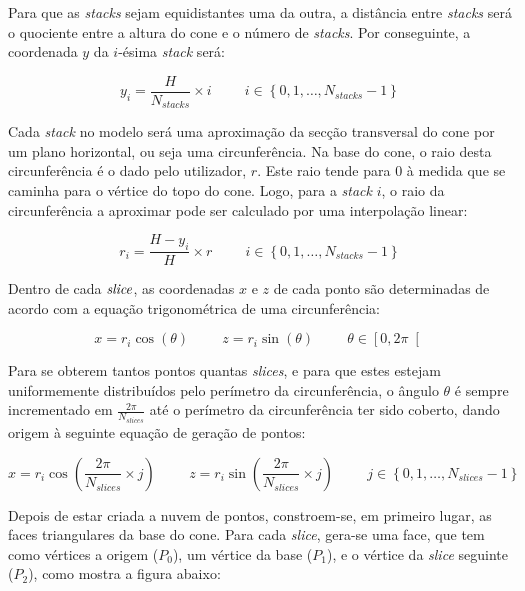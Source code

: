 \documentclass[12pt, a4paper]{article}
\begin{document}
Para que as \emph{stacks} sejam equidistantes uma da outra, a distância entre \emph{stacks} será
o quociente entre a altura do cone e o número de \emph{stacks}. Por conseguinte, a coordenada $y$ da
$i$-ésima \emph{stack} será:

$$
y_i = \frac{H}{N_{stacks}} \times i
\hspace{1cm}
i \in \left \lbrace 0, 1, \ldots, N_{stacks} - 1 \right \rbrace
$$

Cada \emph{stack} no modelo será uma aproximação da secção transversal do cone por um plano
horizontal, ou seja uma circunferência. Na base do cone, o raio desta circunferência é o dado pelo
utilizador, $r$. Este raio tende para 0 à medida que se caminha para o vértice do topo do cone.
Logo, para a \emph{stack} $i$, o raio da circunferência a aproximar pode ser calculado por uma
interpolação linear:

$$
r_i = \frac{H - y_i}{H}\times r
\hspace{1cm}
i \in \left \lbrace 0, 1, \ldots, N_{stacks} - 1 \right \rbrace
$$

Dentro de cada $\emph{slice}$, as coordenadas $x$ e $z$ de cada ponto são determinadas de acordo
com a equação trigonométrica de uma circunferência:

$$
x = r_i \cos(\theta)
\hspace{1cm}
z = r_i \sin(\theta)
\hspace{1cm}
\theta \in \left [ 0, 2 \pi \right [
$$

Para se obterem tantos pontos quantas \emph{slices}, e para que estes estejam uniformemente
distribuídos pelo perímetro da circunferência, o ângulo $\theta$ é sempre incrementado em
$\frac{2 \pi}{N_{slices}}$ até o perímetro da circunferência ter sido coberto, dando origem à
seguinte equação de geração de pontos:

$$
x = r_i \cos \left ( \frac{2 \pi}{N_{slices}} \times j \right )
\hspace{1cm}
z = r_i \sin \left ( \frac{2 \pi}{N_{slices}} \times j \right )
\hspace{1cm}
j \in \left \lbrace 0, 1, \ldots, N_{slices} - 1 \right \rbrace
$$

Depois de estar criada a nuvem de pontos, constroem-se, em primeiro lugar, as faces triangulares da
base do cone. Para cada \emph{slice}, gera-se uma face, que tem  como vértices a origem ($P_0$), um
vértice da base ($P_1$), e o vértice da \emph{slice} seguinte ($P_2$), como mostra a figura abaixo:
\end{document}
